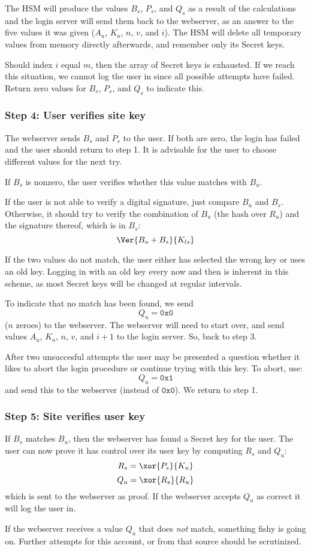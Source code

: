 The HSM will produce the values $B_s$,
$P_s$,
and $Q_s$ as a result of the calculations and the login server will send them back to the webserver,
as an answer to the five values it was given ($A_u$, $K_a$, $n$, $v$, and $i$).
The HSM will delete all temporary values from memory directly afterwards, and remember only its Secret keys.
\par
Should index $i$ equal $m$, then the array of Secret keys is exhausted.
If we reach this situation, we cannot log the user in since all possible attempts have failed.
Return zero values for $B_s$, $P_s$, and $Q_s$ to indicate this.

\subsubsection{Step 4: User verifies site key}
\label{sec:login_step4}
The webserver sends $B_s$ and $P_s$ to the user.
If both are zero, the login has failed and the user should return to step 1.
It is advisable for the user to choose different values for the next try.
\par
If $B_s$ is nonzero, the user verifies whether this value matches with $B_u$.
\par
If the user is not able to verify a digital signature,
just compare $B_u$ and $B_s$.
Otherwise,
it should try to verify the combination of $B_u$
(the hash over $R_u$)
and the signature thereof,
which is in $B_s$:
\[\Ver{B_u+B_s}{K_{ls}}\]
\par
If the two values do not match,
the user either has selected the wrong key or uses an old key.
Logging in with an old key every now and then is inherent in this scheme,
as most Secret keys will be changed at regular intervals.
\par
To indicate that no match has been found, we send
\[Q_u=\mathtt{0x0}\]
($n$ zeroes) to the webserver.
The webserver will need to start over, and send values $A_u$, $K_a$, $n$, $v$, and $i+1$ to the login server.
So, back to step 3.
\par
After two unsuccesful attempts the user may be presented a question
whether it likes to abort the login procedure or continue trying with this key.
To abort, use:
\[Q_u=\mathtt{0x1}\]
and send this to the webserver
(instead of $\mathtt{0x0}$).
We return to step 1.

\subsubsection{Step 5: Site verifies user key}
\label{sec:login_step5}
If $B_s$ matches $B_u$, then the webserver has found a Secret key for the user.
The user can now prove it has control over its user key by computing $R_s$ and $Q_u$:
\[R_s=\xor{P_s}{K_u}\]
\[Q_u=\xor{R_s}{R_u}\]
which is sent to the webserver as proof.
If the webserver accepts $Q_u$ as correct it will log the user in.
\par
If the webserver receives a value $Q_u$ that does \emph{not} match,
something fishy is going on.
Further attempts for this account, or from that source should be scrutinized.

